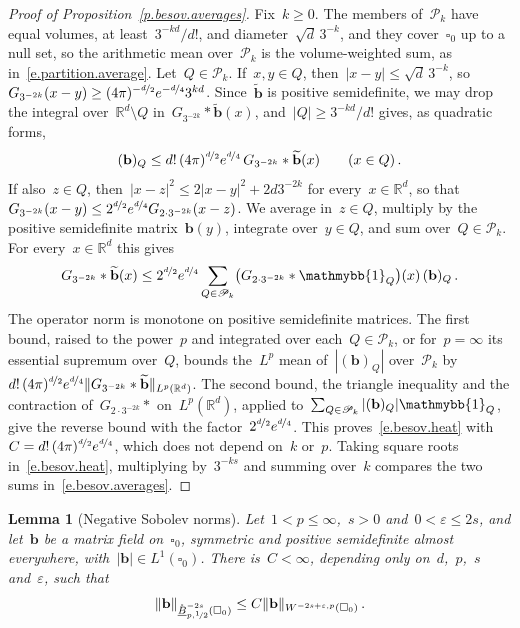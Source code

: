\documentclass[11pt,letterpaper]{article}
\numberwithin{equation}{section}
\newtheorem{lemma}[theorem]{Lemma}
\theoremstyle{definition}
\newcommand{\Rd}{\mathbb{R}^d}
\newcommand{\eps}{\varepsilon}
\newcommand{\nf}{\nicefrac}
\newcommand{\cu}{\square}
\DeclarePairedDelimiter{\norm}{\lVert}{\rVert}
\newcommand{\indc}{{\mathmybb{1}}}
\begin{document}
\begin{proof}[Proof of Proposition~\ref{p.besov.averages}]
Fix~$k\geq0$. The members of~$\mathscr P_k$ have equal volumes, at least~$3^{-kd}/d!$, and diameter~$\sqrt d\,3^{-k}$, and they cover~$\cu_0$ up to a null set, so the arithmetic mean over~$\mathscr P_k$ is the volume-weighted sum, as in~\eqref{e.partition.average}. Let~$Q\in\mathscr P_k$. If~$x,y\in Q$, then~$|x-y|\leq\sqrt d\,3^{-k}$, so~$G_{3^{-2k}}(x-y)\geq(4\pi)^{-\nf d2}e^{-\nf d4}3^{kd}$. Since~$\widetilde{\mathbf b}$ is positive semidefinite, we may drop the integral over~$\Rd\setminus Q$ in~$G_{3^{-2k}}*\widetilde{\mathbf b}(x)$, and~$|Q|\geq3^{-kd}/d!$ gives, as quadratic forms,
\begin{equation*}
	(\mathbf b)_Q\leq d!\,(4\pi)^{\nf d2}e^{\nf d4}\,G_{3^{-2k}}*\widetilde{\mathbf b}(x)\qquad(x\in Q)\,.
\end{equation*}
If also~$z\in Q$, then~$|x-z|^2\leq2|x-y|^2+2d3^{-2k}$ for every~$x\in\Rd$, so that~$G_{3^{-2k}}(x-y)\leq2^{\nf d2}e^{\nf d4}G_{2\cdot3^{-2k}}(x-z)$. We average in~$z\in Q$, multiply by the positive semidefinite matrix~$\mathbf b(y)$, integrate over~$y\in Q$, and sum over~$Q\in\mathscr P_k$. For every~$x\in\Rd$ this gives
\begin{equation*}
	G_{3^{-2k}}*\widetilde{\mathbf b}(x)\leq2^{\nf d2}e^{\nf d4}\sum_{Q\in\mathscr P_k}\bigl(G_{2\cdot3^{-2k}}*\indc_Q\bigr)(x)\,(\mathbf b)_Q\,.
\end{equation*}
The operator norm is monotone on positive semidefinite matrices. The first bound, raised to the power~$p$ and integrated over each~$Q\in\mathscr P_k$, or for~$p=\infty$ its essential supremum over~$Q$, bounds the~$L^p$ mean of~$|(\mathbf b)_Q|$ over~$\mathscr P_k$ by~$d!\,(4\pi)^{\nf d2}e^{\nf d4}\norm{G_{3^{-2k}}*\widetilde{\mathbf b}}_{L^p(\Rd)}$. The second bound, the triangle inequality and the contraction of~$G_{2\cdot3^{-2k}}*$ on~$L^p(\Rd)$, applied to~$\sum_{Q\in\mathscr P_k}|(\mathbf b)_Q|\indc_Q$, give the reverse bound with the factor~$2^{\nf d2}e^{\nf d4}$. This proves~\eqref{e.besov.heat} with~$C=d!\,(4\pi)^{\nf d2}e^{\nf d4}$, which does not depend on~$k$ or~$p$. Taking square roots in~\eqref{e.besov.heat}, multiplying by~$3^{-ks}$ and summing over~$k$ compares the two sums in~\eqref{e.besov.averages}.
\end{proof}

\smallskip

\begin{lemma}[Negative Sobolev norms]
\label{l.negative.sobolev}
Let~$1<p\leq\infty$,~$s>0$ and~$0<\eps\leq2s$, and let~$\mathbf b$ be a matrix field on~$\cu_0$, symmetric and positive semidefinite almost everywhere, with~$|\mathbf b|\in L^1(\cu_0)$. There is~$C<\infty$, depending only on~$d$,~$p$,~$s$ and~$\eps$, such that
\begin{equation*}
	\norm{\mathbf b}_{\mathring{\underline B}^{-2s}_{p,\nf12}(\cu_0)}\leq C\norm{\mathbf b}_{W^{-2s+\eps,p}(\cu_0)}\,.
\end{equation*}
\end{lemma}
\end{document}
